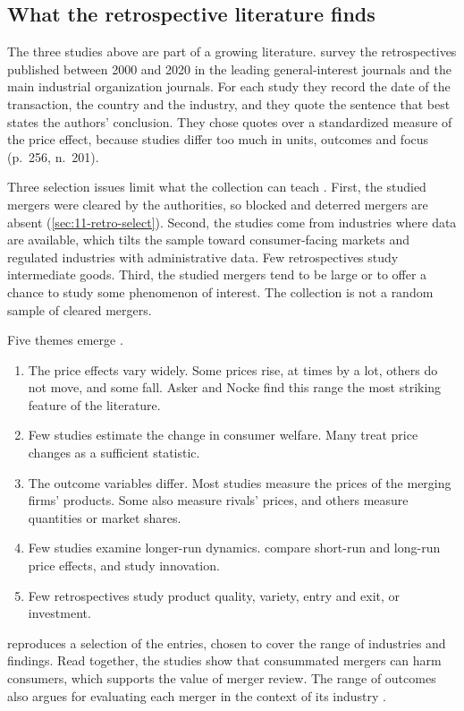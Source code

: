\subsection{What the retrospective literature finds}\label{sec:11-retro-lit}

The three studies above are part of a growing literature. \citet[Section 3.7 and Appendix A]{AskerNocke2021} survey
the retrospectives published between 2000 and 2020 in the leading general-interest journals and the main industrial
organization journals. For each study they record the date of the transaction, the country and the industry, and
they quote the sentence that best states the authors' conclusion. They chose quotes over a standardized measure of
the price effect, because studies differ too much in units, outcomes and focus (p.~256, n.~201).

Three selection issues limit what the collection can teach \citep[pp.~255--256]{AskerNocke2021}. First, the studied
mergers were cleared by the authorities, so blocked and deterred mergers are absent (\cref{sec:11-retro-select}).
Second, the studies come from industries where data are available, which tilts the sample toward consumer-facing
markets and regulated industries with administrative data. Few retrospectives study intermediate goods. Third, the
studied mergers tend to be large or to offer a chance to study some phenomenon of interest. The collection is not a
random sample of cleared mergers.

Five themes emerge \citep[p.~257]{AskerNocke2021}.
\begin{enumerate}[label=(\roman*)]
\item The price effects vary widely. Some prices rise, at times by a lot, others do not move, and some fall. Asker
and Nocke find this range the most striking feature of the literature.
\item Few studies estimate the change in consumer welfare. Many treat price changes as a sufficient statistic.
\item The outcome variables differ. Most studies measure the prices of the merging firms' products. Some also measure
rivals' prices, and others measure quantities or market shares.
\item Few studies examine longer-run dynamics. \citet{FocarelliPanetta2003} compare short-run and long-run price
effects, and \citet{IgamiUetake2019} study innovation.
\item Few retrospectives study product quality, variety, entry and exit, or investment.
\end{enumerate}
 reproduces a selection of the entries, chosen to cover the range of industries and findings.
Read together, the studies show that consummated mergers can harm consumers, which supports the value of merger
review. The range of outcomes also argues for evaluating each merger in the context of its industry
\citep[p.~257]{AskerNocke2021}.

